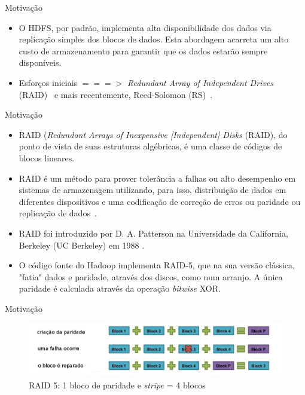   \begin{frame}{Motivação}
     \begin{itemize}
      \item O HDFS, por padrão, implementa alta disponibilidade dos dados via replicação simples dos blocos de dados. Esta abordagem acarreta um alto custo de armazenamento para garantir que os dados estarão sempre disponíveis.
      \item Esforços iniciais $===>$ \emph{Redundant Array of Independent Drives} (RAID)~\cite{HDFS-503:2010,Patterson:1988} e mais recentemente, Reed-Solomon (RS)~\cite{MR-1969:2010}.
     \end{itemize}
  \end{frame}


  \begin{frame}{Motivação}
     \begin{itemize}
        \item RAID (\emph{Redundant Arrays of Inexpensive [Independent] Disks} (RAID), do ponto de vista de suas estruturas algébricas, é uma classe de códigos de blocos lineares.
        \item RAID é um método para prover tolerância a falhas ou alto desempenho em sistemas de armazenagem utilizando, para isso, distribuição de dados em diferentes dispositivos e uma codificação de correção de erros ou paridade ou replicação de dados~\cite{Ramakrishnan:2003}.
        \item RAID foi introduzido por D. A. Patterson na Universidade da California, Berkeley (UC Berkeley) em 1988 \cite{Patterson:1988}.
        \item O código fonte do Hadoop implementa RAID-5, que na sua versão clássica, "fatia" dados e paridade, através dos discos, como num arranjo. A única paridade é calculada através da operação \emph{bitwise} XOR. 
     \end{itemize}
  \end{frame}


 \begin{frame}{Motivação}
    \begin{figure}[hb]
      \centering
      \includegraphics[scale=0.35]{raid5.jpg}
      \caption{RAID 5: 1 bloco de paridade e \emph{stripe} = 4 blocos \cite{MR-2036:2010}}
      \label{fig5:raid5}
    \end{figure}
 \end{frame}


